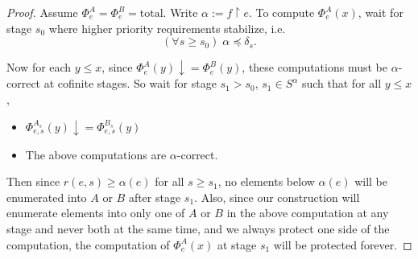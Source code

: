   \begin{proof}
    Assume $\Phi_e^A=\Phi_e^B=\text{total}$. Write $\alpha:=f\restriction
    e$. To compute $\Phi_e^A(x)$, wait for stage $s_0$ where higher
    priority requirements stabilize, i.e.
    \[(\forall s\geq s_0)\; \alpha\preceq\delta_s.\]

    Now for each $y\leq x$, since $\Phi_e^A(y) \downarrow=\Phi_e^B(y)$,
    these computations must be $\alpha$-correct at cofinite stages. So wait
    for stage $s_1>s_0$, $s_1\in S^\alpha$ such that for all $y\leq x$,
    \begin{itemize}
      \item $\Phi_{e,s}^{A_s}(y) \downarrow=\Phi_{e,s}^{B_s}(y)$
      \item The above computations are $\alpha$-correct.
    \end{itemize}

    Then since $r(e,s)\geq \alpha(e)$ for all $s\geq s_1$, no elements
    below $\alpha(e)$ will be enumerated into $A$ or $B$ after stage $s_1$.
    Also, since our construction will enumerate elements into only one of
    $A$ or $B$ in the above computation at any stage and never both at the
    same time, and we always protect one side of the computation, the
    computation of $\Phi_e^A(x)$ at stage $s_1$ will be protected forever.
  \end{proof}
